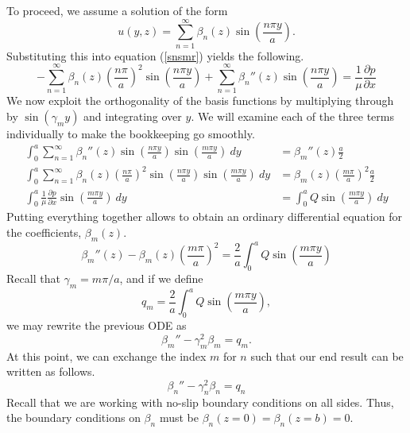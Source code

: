 To proceed, we assume a solution of the form
\begin{equation}
    u(y,z) = \sum_{n=1}^{\infty} \beta_n(z) \sin\left(\frac{n \pi y}{a}\right).
\end{equation}
Substituting this into equation (\ref{snsmr}) yields the following.
\begin{equation}
    -\sum_{n=1}^{\infty} \beta_n(z) \left(\frac{n \pi}{a}\right)^2 \sin\left(\frac{n \pi y}{a}\right) + \sum_{n=1}^{\infty} \beta_n''(z) \sin\left(\frac{n \pi y}{a}\right) = \frac{1}{\mu}\frac{\partial p}{\partial x}
\end{equation}
We now exploit the orthogonality of the basis functions by multiplying through by $\sin(\gamma_m y)$ and integrating over $y$. We will examine each of the three terms individually to make the bookkeeping go smoothly.
\begin{align}
    \int_{0}^{a} \sum_{n=1}^{\infty} \beta_n''(z) \sin\left(\frac{n \pi y}{a}\right) \sin\left(\frac{m \pi y}{a}\right)\ dy &= \beta_m''(z) \frac{a}{2}\\
    \int_{0}^{a} \sum_{n=1}^{\infty} \beta_n(z) \left(\frac{n \pi}{a}\right)^2 \sin\left(\frac{n \pi y}{a}\right) \sin\left(\frac{m \pi y}{a}\right)\ dy &= \beta_m(z) \left(\frac{m \pi}{a}\right)^2 \frac{a}{2}\\
    \int_{0}^{a} \frac{1}{\mu}\frac{\partial p}{\partial x} \sin\left(\frac{m \pi y}{a}\right)\ dy &= \int_{0}^{a} Q \sin\left(\frac{m \pi y}{a}\right)\ dy
\end{align}
Putting everything together allows to obtain an ordinary differential equation for the coefficients, $\beta_m(z)$.
\begin{equation}
    \beta_m''(z) - \beta_m(z) \left(\frac{m \pi}{a}\right)^2 = \frac{2}{a}\int_{0}^{a} Q \sin\left(\frac{m \pi y}{a}\right)
\end{equation}
Recall that $\gamma_m = m\pi/a$, and if we define
\begin{equation}
    q_m = \frac{2}{a}\int_{0}^{a} Q \sin\left(\frac{m \pi y}{a}\right),
\end{equation}
we may rewrite the previous ODE as
\begin{equation}
    \beta_m'' - \gamma_m^2 \beta_m = q_m.
\end{equation}
At this point, we can exchange the index $m$ for $n$ such that our end result can be written as follows.
\begin{equation}
    \boxed{\beta_n'' - \gamma_n^2 \beta_n = q_n}
    \label{odebeta}
\end{equation}
Recall that we are working with no-slip boundary conditions on all sides. Thus, the boundary conditions on $\beta_n$ must be $\beta_n(z=0) = \beta_n(z=b) = 0$.